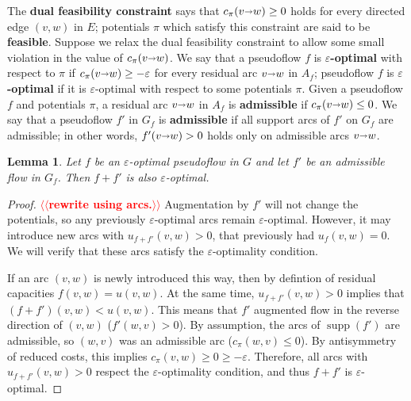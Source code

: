 \documentclass[11pt]{article}
\makeatletter
\def\eps{\varepsilon}
\def\arcto{\mathord\shortrightarrow}
\def\arc#1#2{#1\arcto#2}
\def\supp{\operatorname{supp}}
\theoremstyle{plain}
\newtheorem{lemma}{Lemma}[section]
\numberwithin{figure}{section}
\def\EMPH#1{\textbf{\boldmath #1}}
\def\n@te#1{\textsf{\boldmath \textbf{$\langle\!\langle$#1$\rangle\!\rangle$}}\leavevmode}
\def\note#1{\textcolor{red}{\n@te{#1}}}
\makeatother
\begin{document}
The \EMPH{dual feasibility constraint} says that $c_\pi(\arc vw) \geq 0$ holds for every directed edge $(v,w)$ in $E$; potentials $\pi$ which satisfy this constraint are said to be \EMPH{feasible}.
%
%
Suppose we relax the dual feasibility constraint to allow some small violation in the value of $c_\pi(\arc vw)$.
We say that a pseudoflow $f$ is \EMPH{$\eps$-optimal} with respect to $\pi$ if
$c_\pi(\arc vw) \geq -\eps$ for every residual arc $\arc vw$ in $A_f$; pseudoflow $f$ is \EMPH{$\eps$-optimal} if it is $\eps$-optimal with respect to some potentials $\pi$.
%
Given a pseudoflow $f$ and potentials $\pi$, a residual arc $\arc vw$ in $A_f$ is
\EMPH{admissible} if $c_\pi(\arc vw) \leq 0$.
We say that a pseudoflow $f'$ in $G_f$ is \EMPH{admissible} if all support arcs of $f'$ on $G_f$ are admissible; in other words, $f'(\arc vw) > 0$ holds
only on admissible arcs $\arc vw$.

\begin{lemma}
Let $f$ be an $\eps$-optimal pseudoflow in $G$ and let $f'$ be an
admissible flow in $G_f$.
Then $f + f'$ is also $\eps$-optimal.
\end{lemma}

\begin{proof}
\note{rewrite using arcs.}
Augmentation by $f'$ will not change the potentials, so any previously
$\eps$-optimal arcs remain $\eps$-optimal.
However, it may introduce new arcs with $u_{f+f'}(v, w) > 0$, that previously had
$u_f(v, w) = 0$.
We will verify that these arcs satisfy the $\eps$-optimality condition.

If an arc $(v, w)$ is newly introduced this way, then by defintion of residual
capacities $f(v, w) = u(v, w)$.
At the same time, $u_{f+f'}(v, w) > 0$ implies that $(f+f')(v, w) < u(v, w)$.
This means that $f'$ augmented flow in the reverse direction of $(v, w)$
($f'(w, v) > 0$).
By assumption, the arcs of $\supp(f')$ are admissible, so $(w, v)$ was an
admissible arc ($c_\pi(w, v) \leq 0$).
By antisymmetry of reduced costs, this implies $c_\pi(v, w) \geq 0 \geq -\eps$.
Therefore, all arcs with $u_{f+f'}(v, w) > 0$ respect the $\eps$-optimality condition,
and thus $f+f'$ is $\eps$-optimal.
\end{proof}
\end{document}
